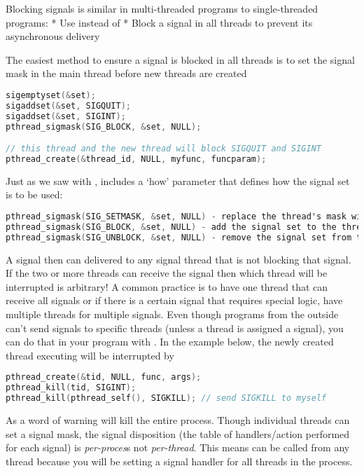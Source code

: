 Blocking signals is similar in multi-threaded programs to single-threaded programs: 
* Use  instead of 
* Block a signal in all threads to prevent its asynchronous delivery

The easiest method to ensure a signal is blocked in all threads is to set the signal mask in the main thread before new threads are created

\begin{lstlisting}[language=C]
sigemptyset(&set);
sigaddset(&set, SIGQUIT);
sigaddset(&set, SIGINT);
pthread_sigmask(SIG_BLOCK, &set, NULL);

// this thread and the new thread will block SIGQUIT and SIGINT
pthread_create(&thread_id, NULL, myfunc, funcparam);
\end{lstlisting}

Just as we saw with ,  includes a `how' parameter that defines how the signal set is to be used:

\begin{lstlisting}[language=C]
pthread_sigmask(SIG_SETMASK, &set, NULL) - replace the thread's mask with given signal set
pthread_sigmask(SIG_BLOCK, &set, NULL) - add the signal set to the thread's mask
pthread_sigmask(SIG_UNBLOCK, &set, NULL) - remove the signal set from the thread's mask
\end{lstlisting}

A signal then can delivered to any signal thread that is not blocking that signal. If the two or more threads can receive the signal then which thread will be interrupted is arbitrary! A common practice is to have one thread that can receive all signals or if there is a certain signal that requires special logic, have multiple threads for multiple signals. Even though programs from the outside can't send signals to specific threads (unless a thread is assigned a signal), you can do that in your program with . In the example below, the newly created thread executing  will be interrupted by 

\begin{lstlisting}[language=C]
pthread_create(&tid, NULL, func, args);
pthread_kill(tid, SIGINT);
pthread_kill(pthread_self(), SIGKILL); // send SIGKILL to myself
\end{lstlisting}

As a word of warning  will kill the entire process. Though individual threads can set a signal mask, the signal disposition (the table of handlers/action performed for each signal) is \emph{per-proces}s not \emph{per-thread}. This means  can be called from any thread because you will be setting a signal handler for all threads in the process.

